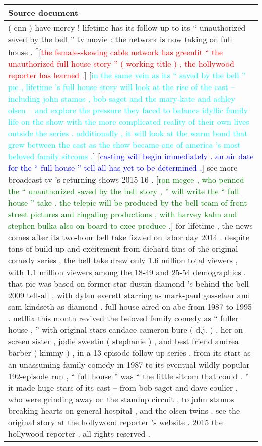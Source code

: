 \documentclass[11pt,a4paper]{article}
\begin{document}
\begin{figure*}[t]
\centering
\begin{tabular*}{\textwidth}{| p{} | }
  \hline
  \textbf{Source document} \\ \hline
        ( cnn ) have mercy ! lifetime has its follow-up to its `` unauthorized saved by the bell '' tv movie : the network is now taking on full house .
        \textsuperscript{*}[\textcolor{red}{the female-skewing cable network has greenlit `` the unauthorized full house story '' ( working title ) , the hollywood reporter has learned .}]
        \textsuperscript{}[\textcolor{cyan}{in the same vein as its `` saved by the bell '' pic , lifetime 's full house story will look at the rise of the cast -- including john stamos , bob saget and the mary-kate and ashley olsen -- and explore the pressure they faced to balance idyllic family life on the show with the more complicated reality of their own lives outside the series . additionally , it will look at the warm bond that grew between the cast as the show became one of america 's most beloved family sitcoms .}]
        \textsuperscript{}[\textcolor{blue}{casting will begin immediately . an air date for the `` full house '' tell-all has yet to be determined .}]
        see more broadcast tv 's returning shows 2015-16 .
        \textsuperscript{}[\textcolor{green}{ron mcgee , who penned the `` unauthorized saved by the bell story , '' will write the `` full house '' take . the telepic will be produced by the bell team of front street pictures and ringaling productions , with harvey kahn and stephen bulka also on board to exec produce .}]
        for lifetime , the news comes after its two-hour bell take fizzled on labor day 2014 . despite tons of build-up and excitement from diehard fans of the original comedy series , the bell take drew only 1.6 million total viewers , with 1.1 million viewers among the 18-49 and 25-54 demographics . that pic was based on former star dustin diamond 's behind the bell 2009 tell-all , with dylan everett starring as mark-paul gosselaar and sam kindseth as diamond .
        full house aired on abc from 1987 to 1995 . netflix this month revived the beloved family comedy as `` fuller house , '' with original stars candace cameron-bure ( d.j. ) , her on-screen sister , jodie sweetin ( stephanie ) , and best friend andrea barber ( kimmy ) , in a 13-episode follow-up series .
        from its start as an unassuming family comedy in 1987 to its eventual wildly popular 192-episode run , `` full house '' was `` the little sitcom that could . '' it made huge stars of its cast -- from bob saget and dave coulier , who were grinding away on the standup circuit , to john stamos breaking hearts on general hospital , and the olsen twins .
        see the original story at the hollywood reporter 's website .
        2015 the hollywood reporter . all rights reserved .



\end{tabular*}
\end{figure*}
\end{document}
